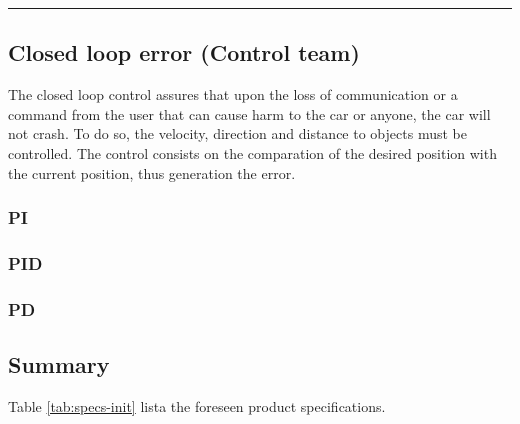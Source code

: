 \noindent\rule{\textwidth}{0.5pt}
\subsection{Closed loop error (Control team)}
\label{sec:org436f732}
The closed loop control assures that upon the loss of communication or a command from the user that can cause harm to the car or anyone, the car will not crash. To do so, the velocity, direction and distance to objects must be controlled. The control consists on the comparation of the desired position with the current position, thus generation the error.
\subsubsection{PI}
\label{sec:org9859444}
\subsubsection{PID}
\label{sec:org352c4d4}
\subsubsection{PD}
\label{sec:org0d324c4}

\subsection{Summary}
\label{sec:org1f95256}
Table \ref{tab:specs-init} lista the foreseen product specifications.

